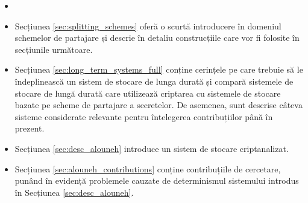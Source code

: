 \documentclass[oneside, 12pt]{book}
\newcommand{\todo}[1]{{\color{red}{TODO #1}}}
\begin{document}
\begin{itemize}
	\item \todo{Completeaza descrierea}
	\item Secțiunea {\ref{sec:splitting_schemes}} oferă o scurtă introducere în domeniul schemelor de partajare și descrie în detaliu construcțiile care vor fi folosite în secțiunile următoare.
	\item Secțiunea {\ref{sec:long_term_systems_full}} conține cerințele pe care trebuie să le îndeplinească un sistem de stocare de lunga durată și compară sistemele de stocare de lungă durată care utilizează criptarea cu sistemele de stocare bazate pe scheme de partajare a secretelor. De asemenea, sunt descrise câteva sisteme considerate relevante pentru întelegerea contribuțiilor până în prezent.
	\item Secțiunea {\ref{sec:desc_alouneh}} introduce un sistem de stocare criptanalizat.
	\item Secțiunea {\ref{sec:alouneh_contributions}} conține contribuțiile de cercetare, punând în evidență problemele cauzate de determinismul sistemului introdus în Secțiunea {\ref{sec:desc_alouneh}}.
\end{itemize}









\end{document}
